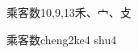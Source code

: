 \begin{entry}{乘客数}{10,9,13}{⽲、⼧、⽁}
  \begin{phonetics}{乘客数}{cheng2ke4 shu4}
  \end{phonetics}
\end{entry}
